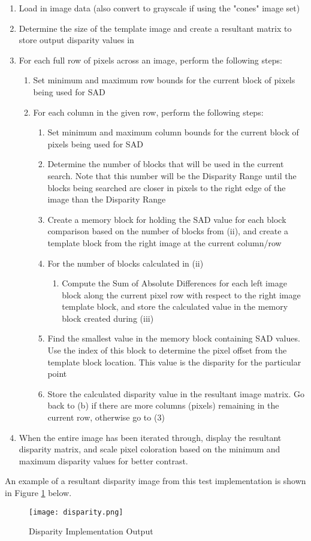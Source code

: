 \begin{enumerate}
\item
Load in image data (also convert to grayscale if using the "cones" image set)
\item
Determine the size of the template image and create a resultant matrix to store output disparity values in
\item
For each full row of pixels across an image, perform the following steps:
\begin{enumerate}
\item
Set minimum and maximum row bounds for the current block of pixels being used for SAD 
\item
For each column in the given row, perform the following steps:
\begin{enumerate}
\item
Set minimum and maximum column bounds for the current block of pixels being used for SAD
\item
Determine the number of blocks that will be used in the current search. Note that this number will be the Disparity Range until the blocks being searched are closer in pixels to the right edge of the image than the Disparity Range
\item
Create a memory block for holding the SAD value for each block comparison based on the number of blocks from (ii), and create a template block from the right image at the current column/row
\item
For the number of blocks calculated in (ii)
\begin{enumerate}
\item
Compute the Sum of Absolute Differences for each left image block along the current pixel row with respect to the right image template block, and store the calculated value in the memory block created during (iii)
\end{enumerate}
\item
Find the smallest value in the memory block containing SAD values. Use the index of this block to determine the pixel offset from the template block location. This value is the disparity for the particular point
\item
Store the calculated disparity value in the resultant image matrix. Go back to (b) if there are more columns (pixels) remaining in the current row, otherwise go to (3)
\end{enumerate}
\end{enumerate}
\item
When the entire image has been iterated through, display the resultant disparity matrix, and scale pixel coloration based on the minimum and maximum disparity values for better contrast.
\end{enumerate}
\doublespacing
\par
An example of a resultant disparity image from this test implementation is shown in Figure \ref{dispMatlabOutput} below.
\begin{figure}[H]
	\centerline{\texttt{[image: disparity.png]}}
	\caption{Disparity Implementation Output}
	\label{dispMatlabOutput}
\end{figure}

